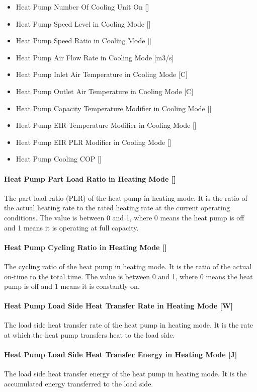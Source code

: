 \begin{itemize}
\item Heat Pump Number Of Cooling Unit On {[}{]}
\item Heat Pump Speed Level in Cooling Mode {[}{]}
\item Heat Pump Speed Ratio in Cooling Mode {[}{]}
\item Heat Pump Air Flow Rate in Cooling Mode {[}m3/s{]}
\item Heat Pump Inlet Air Temperature in Cooling Mode {[}C{]}
\item Heat Pump Outlet Air Temperature in Cooling Mode {[}C{]}
\item Heat Pump Capacity Temperature Modifier in Cooling Mode {[}{]}
\item Heat Pump EIR Temperature Modifier in Cooling Mode {[}{]}
\item Heat Pump EIR PLR Modifier in Cooling Mode {[}{]}
\item Heat Pump Cooling COP {[}{]}
\end{itemize}
\paragraph{Heat Pump Part Load Ratio in Heating Mode {[}{]}} The part load ratio
(PLR) of the heat pump in heating mode. It is the ratio of the actual heating
rate to the rated heating rate at the current operating conditions. The value is
between 0 and 1, where 0 means the heat pump is off and 1 means it is operating
at full capacity.
\paragraph{Heat Pump Cycling Ratio in Heating Mode {[}{]}} The cycling ratio of
the heat pump in heating mode. It is the ratio of the actual on-time to the
total time. The value is between 0 and 1, where 0 means the heat pump is off and
1 means it is constantly on.
\paragraph{Heat Pump Load Side Heat Transfer Rate in Heating Mode {[}W{]}} The
load side heat transfer rate of the heat pump in heating mode. It is the rate at
which the heat pump transfers heat to the load side.
\paragraph{Heat Pump Load Side Heat Transfer Energy in Heating Mode {[}J{]}} The
load side heat transfer energy of the heat pump in heating mode. It is the
accumulated energy transferred to the load side.
